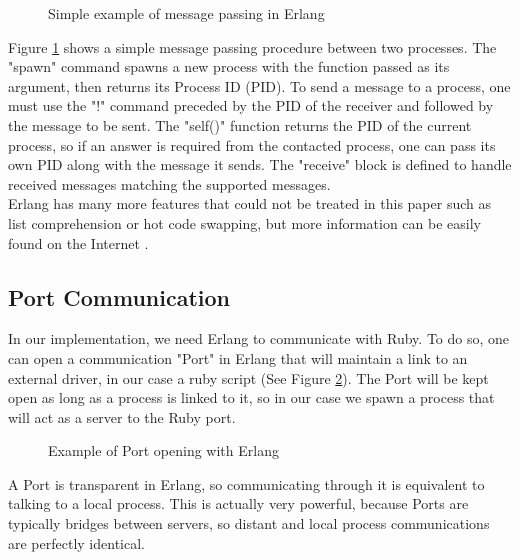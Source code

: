 \begin{figure}[ht]
  \centering
  \caption{Simple example of message passing in Erlang}
  \label{fig:erlang_message}
\end{figure}

Figure \ref{fig:erlang_message} shows a simple message passing procedure between two processes. The "spawn" command spawns a new process with the function passed as its argument, then returns its Process ID (PID). To send a message to a process, one must use the "!" command preceded by the PID of the receiver and followed by the message to be sent. The "self()" function returns the PID of the current process, so if an answer is required from the contacted process, one can pass its own PID along with the message it sends. The "receive" block is defined to handle received messages matching the supported messages.\\

Erlang has many more features that could not be treated in this paper such as list comprehension or hot code swapping, but more information can be easily found on the Internet \cite{Erl10}.

\subsection{Port Communication}

In our implementation, we need Erlang to communicate with Ruby. To do so, one can open a communication "Port" in Erlang that will maintain a link to an external driver, in our case a ruby script (See Figure \ref{fig:erlang_port}). The Port will be kept open as long as a process is linked to it, so in our case we spawn a process that will act as a server to the Ruby port.\\

\begin{figure}[ht]
  \centering
  \caption{Example of Port opening with Erlang}
  \label{fig:erlang_port}
\end{figure}

A Port is transparent in Erlang, so communicating through it is equivalent to talking to a local process. This is actually very powerful, because Ports are typically bridges between servers, so distant and local process communications are perfectly identical.\\

